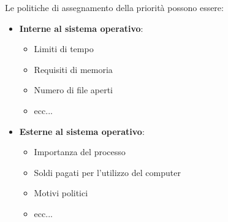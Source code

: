 \documentclass[a4paper]{article}
\begin{document}
\vspace{1em}
\noindent
Le politiche di assegnamento della priorità possono essere:
\begin{itemize}
  \item \textbf{Interne al sistema operativo}:
    \begin{itemize}
      \item Limiti di tempo
      \item Requisiti di memoria
      \item Numero di file aperti
      \item ecc...
    \end{itemize}

  \item \textbf{Esterne al sistema operativo}:
    \begin{itemize}
      \item Importanza del processo
      \item Soldi pagati per l'utilizzo del computer
      \item Motivi politici
      \item ecc...
    \end{itemize}
\end{itemize}
\end{document}
